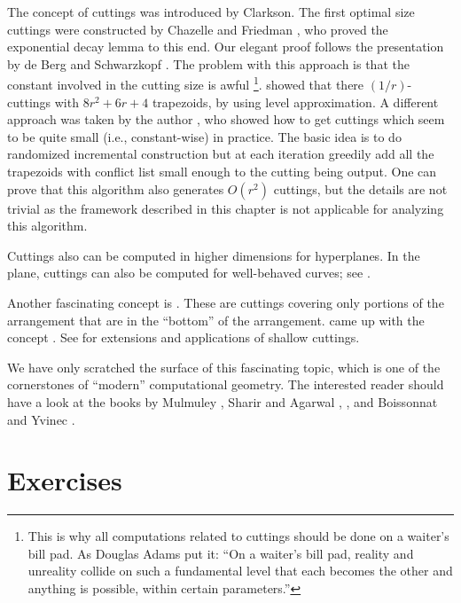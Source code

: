   The concept of cuttings was introduced by
Clarkson. The first optimal size cuttings were constructed by Chazelle
and Friedman \cite{cf-dvrsi-90}, who proved the exponential decay
lemma to this end. Our elegant proof follows the presentation by d{}e
Berg and Schwarzkopf \cite{bs-ca-95}. The problem with this approach
is that the constant involved in the cutting size is awful%
\footnote{This is why all computations related to cuttings should be
   done on a waiter's bill pad. As Douglas Adams put it: ``On a
   waiter's bill pad, reality and unreality collide on such a
   fundamental level that each becomes the other and anything is
   possible, within certain parameters.''}. %
\Matousek \cite{m-ocfcp-98} showed that there $(1/r)$-cuttings with
$8r^2 + 6r + 4$ trapezoids, by using level approximation. A different
approach was taken by the author \cite{h-cctp-00}, who showed how to
get cuttings which seem to be quite small (i.e., constant-wise) in
practice. The basic idea is to do randomized incremental construction
but at each iteration greedily add all the trapezoids with conflict
list small enough to the cutting being output. One can prove that this
algorithm also generates $O(r^2)$ cuttings, but the details are not
trivial as the framework described in this chapter is not applicable
for analyzing this algorithm.

Cuttings also can be computed in higher dimensions for hyperplanes. In
the plane, cuttings can also be computed for well-behaved curves; see
\cite{sa-dsstg-95}.

Another fascinating concept is . These are
cuttings covering only portions of the arrangement that are in the
``bottom'' of the arrangement. \Matousek came up with the concept
\cite{m-rph-92}.  See \cite{aes-vdsl3-99, cch-smcpg-09} for extensions
and applications of shallow cuttings.

  We have
only scratched the surface of this fascinating topic, which is one of
the cornerstones of ``modern'' computational geometry. The interested
reader should have a look at the books by Mulmuley \cite{m-cgitr-94},
Sharir and Agarwal \cite{sa-dsstg-95}, \Matousek{} \cite{m-ldg-02},
and Boissonnat and Yvinec \cite{by-ag-98}.




\section{Exercises}

